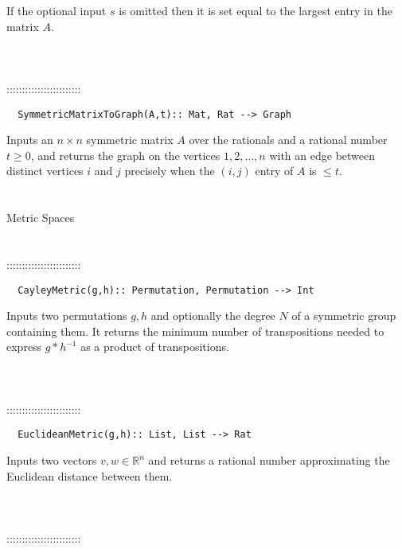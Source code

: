 \documentclass[a4paper,11pt]{report}
\begin{document}
{ If the optional input $s$ is omitted then it is set equal to the largest entry in the matrix $A$. \\
 \\
 \\
 \\
 ::::::::::::::::::::::::\\
 
\begin{verbatim}  SymmetricMatrixToGraph(A,t):: Mat, Rat --> Graph
\end{verbatim}


 

 Inputs an $n\times n$ symmetric matrix $A$ over the rationals and a rational number $t \ge 0$, and returns the graph on the vertices $1,2, \ldots, n$ with an edge between distinct vertices $i$ and $j$ precisely when the $(i,j)$ entry of $A$ is $\le t$. \\
 \\
 \\
 Metric Spaces \\
 \\
 \\
 ::::::::::::::::::::::::\\
 
\begin{verbatim}  CayleyMetric(g,h):: Permutation, Permutation --> Int
\end{verbatim}


 

 Inputs two permutations $g,h$ and optionally the degree $N$ of a symmetric group containing them. It returns the minimum number of
transpositions needed to express $g*h^{-1}$ as a product of transpositions. \\
 \\
 \\
 \\
 ::::::::::::::::::::::::\\
 
\begin{verbatim}  EuclideanMetric(g,h):: List, List --> Rat
\end{verbatim}


 

 Inputs two vectors $v,w \in \mathbb R^n$ and returns a rational number approximating the Euclidean distance between
them. \\
 \\
 \\
 \\
 ::::::::::::::::::::::::\\
 
}
\end{document}
